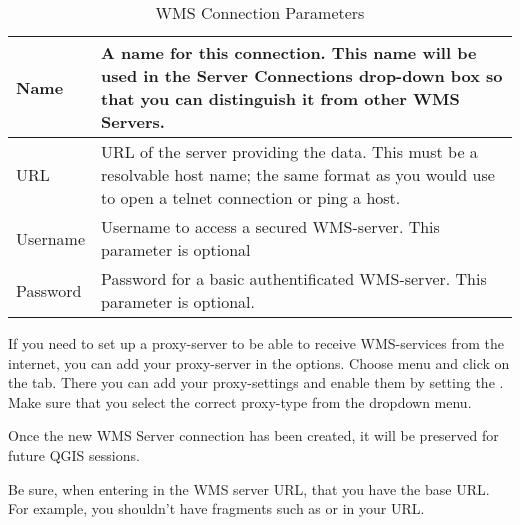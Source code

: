 \begin{table}[ht]
\centering
 \begin{tabular}{|l|p{11cm}|}
\hline Name & A name for this connection.  This name will be used in the
 Server Connections drop-down box so that you can distinguish it from
 other WMS Servers. \\
\hline URL \index{WMS!URL} & URL of the server providing the data.
 This must be a resolvable host name; the same format as you would use
 to open a telnet connection or ping a host. \\
\hline Username \index{WMS!authentification} & Username to access a
secured WMS-server. This parameter is optional \\
\hline Password & Password for a basic authentificated WMS-server. This
parameter is optional.\\
\hline
\end{tabular}
\caption{WMS Connection Parameters}\label{tab:wms_connection_parms}
\end{table}

If you need to set up a proxy-server to be able to receive WMS-services
from the internet, you can add your proxy-server in the options.
Choose menu  \arrow {}
and click on the  tab. There you can add your proxy-settings
and enable them by setting the .
Make sure that you select the correct proxy-type from the
 dropdown menu.

Once the new WMS Server connection has been created, it will be
preserved for future QGIS sessions.

\begin{Tip}[ht]\caption{\textsc{On WMS Server URLs}}
Be sure, when entering in the WMS server URL, that you have
the base URL.  For example, you shouldn't have fragments such as
 or 
in your URL.
\end{Tip}

